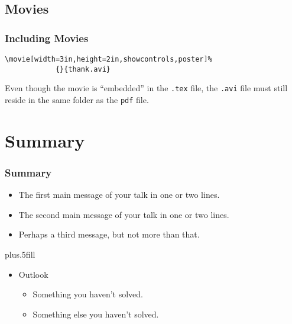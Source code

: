 \documentclass{beamer}
\begin{document}



\subsection{Movies}

\begin{frame}[fragile]
  \frametitle{Including Movies}
\begin{verbatim}
\movie[width=3in,height=2in,showcontrols,poster]%
            {}{thank.avi}
\end{verbatim}

\medskip


Even though the movie is ``embedded'' in the \texttt{.tex} file, the \texttt{.avi} file must still reside in the same folder as the \texttt{pdf}  file.
\end{frame}


\section*{Summary}

\begin{frame}
  \frametitle<presentation>{Summary}

  \begin{itemize}
  \item
    The \alert{first main message} of your talk in one or two lines.\pause
  \item
    The \alert{second main message} of your talk in one or two lines.\pause
  \item
    Perhaps a \alert{third message}, but not more than that.\pause
  \end{itemize}
  
  \vskip0pt plus.5fill
  \begin{itemize}
  \item
    Outlook
    \begin{itemize}
    \item
      Something you haven't solved.
    \item
      Something else you haven't solved.
    \end{itemize}
  \end{itemize}
\end{frame}
\end{document}
